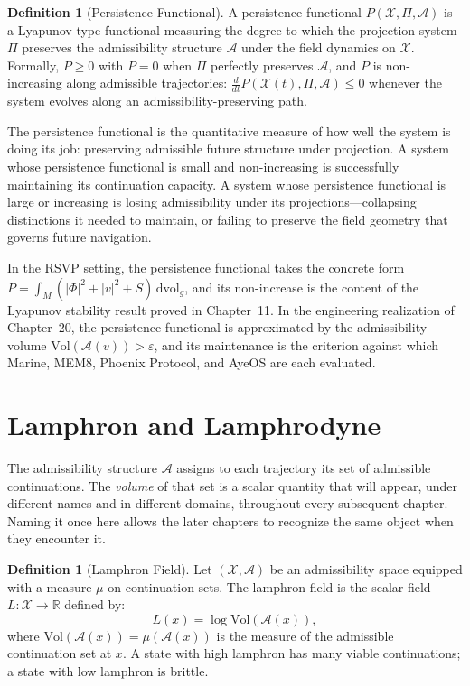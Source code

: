 \documentclass[12pt, oneside]{book}
\theoremstyle{flyxion}
\theoremstyle{definition}
\newtheorem{definition}[theorem]{Definition}
\begin{document}
\begin{definition}[Persistence Functional]
A persistence functional $P(\mathcal{X}, \Pi, \mathcal{A})$
is a Lyapunov-type functional measuring the degree to which
the projection system $\Pi$ preserves the admissibility
structure $\mathcal{A}$ under the field dynamics on
$\mathcal{X}$. Formally, $P \geq 0$ with $P = 0$ when
$\Pi$ perfectly preserves $\mathcal{A}$, and $P$ is
non-increasing along admissible trajectories:
$\frac{d}{dt}P(\mathcal{X}(t), \Pi, \mathcal{A}) \leq 0$
whenever the system evolves along an admissibility-preserving
path.
\end{definition}

The persistence functional is the quantitative measure of
how well the system is doing its job: preserving admissible
future structure under projection. A system whose persistence
functional is small and non-increasing is successfully
maintaining its continuation capacity. A system whose
persistence functional is large or increasing is losing
admissibility under its projections---collapsing distinctions
it needed to maintain, or failing to preserve the field
geometry that governs future navigation.

In the RSVP setting, the persistence functional takes the
concrete form $P = \int_M (|\Phi|^2 + |v|^2 + S)\,
\mathrm{dvol}_g$, and its non-increase is the content of
the Lyapunov stability result proved in Chapter~11. In
the engineering realization of Chapter~20, the persistence
functional is approximated by the admissibility volume
$\mathrm{Vol}(\mathcal{A}(v)) > \varepsilon$, and its
maintenance is the criterion against which Marine, MEM\textbar{}8,
Phoenix Protocol, and AyeOS are each evaluated.

\section{Lamphron and Lamphrodyne}

The admissibility structure $\mathcal{A}$ assigns to each trajectory
its set of admissible continuations. The \emph{volume} of that set
is a scalar quantity that will appear, under different names and in
different domains, throughout every subsequent chapter. Naming it
once here allows the later chapters to recognize the same object
when they encounter it.

\begin{definition}[Lamphron Field]
\label{def:lamphron}
Let $(\mathcal{X}, \mathcal{A})$ be an admissibility space equipped
with a measure $\mu$ on continuation sets. The lamphron field is
the scalar field $L : \mathcal{X} \to \mathbb{R}$ defined by:
\[
L(x) = \log \mathrm{Vol}(\mathcal{A}(x)),
\]
where $\mathrm{Vol}(\mathcal{A}(x)) = \mu(\mathcal{A}(x))$ is the
measure of the admissible continuation set at $x$. A state with
high lamphron has many viable continuations; a state with low
lamphron is brittle.
\end{definition}
\end{document}
